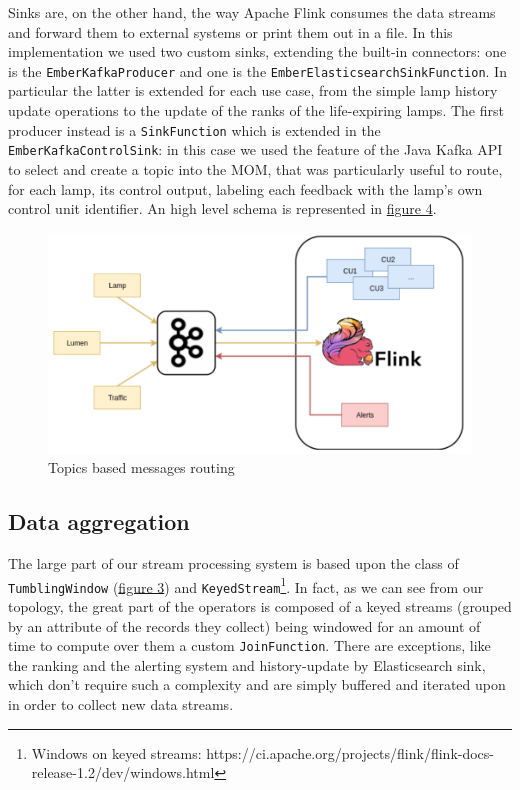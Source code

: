 Sinks are, on the other hand, the way Apache Flink consumes the data streams and forward them to external systems or print them out in a file. In this implementation we used two custom sinks, extending the built-in connectors: one is the \texttt{EmberKafkaProducer} and one is the \texttt{EmberElasticsearchSinkFunction}. In particular the latter is extended for each use case, from the simple lamp history update operations to the update of the ranks of the life-expiring lamps. The first producer instead is a \texttt{SinkFunction} which is extended in the \texttt{EmberKafkaControlSink}: in this case we used the feature of the Java Kafka API to select and create a topic into the MOM, that was particularly useful to route, for each lamp, its control output, labeling each feedback with the lamp's own control unit identifier. An high level schema is represented in \hyperref[fig:ember_kafkatopology]{figure 4}.

\begin{figure}[!b]
\begin{center}
	\includegraphics[scale=0.40]{img/ember_kafkatopology}
	\caption{Topics based messages routing}
	\label{fig:ember_kafkatopology}
\end{center}
\end{figure}


\subsection{Data aggregation}
The large part of our stream processing system is based upon the class of \texttt{TumblingWindow} (\hyperref[fig:flink_windows]{figure 3}) and \texttt{KeyedStream}\footnote{Windows on keyed streams: https://ci.apache.org/projects/flink/flink-docs-release-1.2/dev/windows.html}. In fact, as we can see from our topology, the great part of the operators is composed of a keyed streams (grouped by an attribute of the records they collect) being windowed for an amount of time to compute over them a custom \texttt{JoinFunction}. There are exceptions, like the ranking and the alerting system and history-update by Elasticsearch sink, which don't require such a complexity and are simply buffered and iterated upon in order to collect new data streams. 

